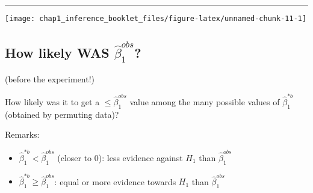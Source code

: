 \documentclass[]{article}
\newenvironment{Shaded}{\begin{snugshade}}{\end{snugshade}}
\newcommand{\KeywordTok}[1]{\textcolor[rgb]{0.13,0.29,0.53}{\textbf{#1}}}
\newcommand{\DataTypeTok}[1]{\textcolor[rgb]{0.13,0.29,0.53}{#1}}
\newcommand{\DecValTok}[1]{\textcolor[rgb]{0.00,0.00,0.81}{#1}}
\newcommand{\StringTok}[1]{\textcolor[rgb]{0.31,0.60,0.02}{#1}}
\newcommand{\CommentTok}[1]{\textcolor[rgb]{0.56,0.35,0.01}{\textit{#1}}}
\newcommand{\ControlFlowTok}[1]{\textcolor[rgb]{0.13,0.29,0.53}{\textbf{#1}}}
\newcommand{\OperatorTok}[1]{\textcolor[rgb]{0.81,0.36,0.00}{\textbf{#1}}}
\newcommand{\NormalTok}[1]{#1}
\providecommand{\tightlist}{%
  \setlength{\itemsep}{0pt}\setlength{\parskip}{0pt}}
\begin{document}
\begin{Shaded}
\end{Shaded}

\begin{center}\rule{0.5\linewidth}{\linethickness}\end{center}

\begin{center}\texttt{[image: chap1\_inference\_booklet\_files/figure-latex/unnamed-chunk-11-1]} \end{center}

\subsection{\texorpdfstring{How likely WAS
\(\hat{\beta}_1 ^{obs}\)?}{How likely WAS \textbackslash{}hat\{\textbackslash{}beta\}\_1 \^{}\{obs\}?}}\label{how-likely-was-hatbeta_1-obs}

(before the experiment!)

How likely was it to get a \(\leq \hat{\beta}_1 ^{obs}\) value among the
many possible values of \(\hat{\beta}_1 ^{*b}\) (obtained by permuting
data)?

Remarks:

\begin{itemize}
\tightlist
\item
  \(\hat{\beta}_1 ^{* b}< \hat{\beta}_1 ^{obs}\) (closer to 0): less
  evidence against \(H_1\) than \(\hat{\beta}_1 ^{obs}\)
\item
  \(\hat{\beta}_1 ^{* b} \geq \hat{\beta}_1 ^{obs}\): equal or more
  evidence towards \(H_1\) than \(\hat{\beta}_1 ^{obs}\)
\end{itemize}
\end{document}
